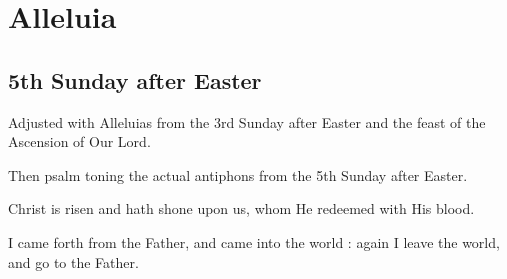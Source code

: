 \documentclass[12pt,a4paper]{article}
\begin{document}
\autocompilegabc

\section{Alleluia}

\subsection{5th Sunday after Easter}

Adjusted with Alleluias from the 3rd Sunday after Easter and the feast of the Ascension of Our Lord.

Then psalm toning the actual antiphons from the 5th Sunday after Easter.

\bigskip


\bigskip

Christ is risen and hath shone upon us, whom He redeemed with His blood.

\bigskip


\bigskip

I came forth from the Father, and came into the world : again I leave the world, and go to the Father.
\end{document}
